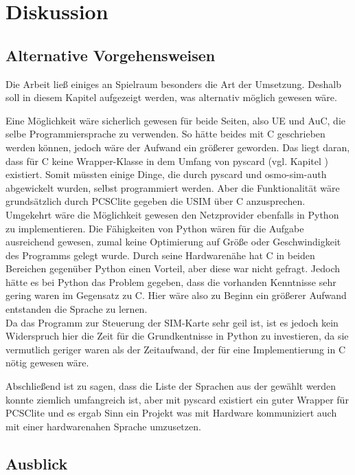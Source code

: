 \section{Diskussion}
\label{diskussion}

	\subsection{Alternative Vorgehensweisen}
	\label{diskussion-alternative}
	
	Die Arbeit ließ einiges an Spielraum besonders die Art der Umsetzung. Deshalb soll in
	diesem Kapitel aufgezeigt werden, was alternativ möglich gewesen wäre.
	
	Eine Möglichkeit wäre sicherlich gewesen für beide Seiten, also UE und AuC, die selbe
	Programmiersprache zu verwenden. So hätte beides mit C geschrieben werden können,
	jedoch wäre der Aufwand ein größerer geworden. Das liegt daran, dass für C keine
	Wrapper-Klasse in dem Umfang von pyscard (vgl. Kapitel ) existiert.
	Somit müssten einige Dinge, die durch pyscard und osmo-sim-auth abgewickelt wurden,
	selbst programmiert werden. Aber die Funktionalität wäre grundsätzlich durch PCSClite
	gegeben die USIM über C anzusprechen. \\
	Umgekehrt wäre die Möglichkeit gewesen den Netzprovider ebenfalls in Python zu
	implementieren. Die Fähigkeiten von Python wären für die Aufgabe ausreichend gewesen,
	zumal keine Optimierung auf Größe oder Geschwindigkeit des Programms gelegt wurde.
	Durch seine Hardwarenähe hat C in beiden Bereichen gegenüber Python einen Vorteil,
	aber diese war nicht gefragt. Jedoch hätte es bei Python das Problem gegeben, dass
	die vorhanden Kenntnisse sehr gering waren im Gegensatz zu C. Hier wäre also zu Beginn
	ein größerer Aufwand entstanden die Sprache zu lernen. \\
	Da das Programm zur Steuerung der SIM-Karte sehr geil ist, ist es jedoch kein Widerspruch
	hier die Zeit für die Grundkentnisse in Python zu investieren, da sie vermutlich geriger waren
	als der Zeitaufwand, der für eine Implementierung in C nötig gewesen wäre.
	
	Abschließend ist zu sagen, dass die Liste der Sprachen aus der gewählt werden konnte ziemlich
	umfangreich ist, aber mit pyscard existiert ein guter Wrapper für PCSClite und es ergab Sinn
	ein Projekt was mit Hardware kommuniziert auch mit einer hardwarenahen Sprache umzusetzen.	
	
	\subsection{Ausblick}
